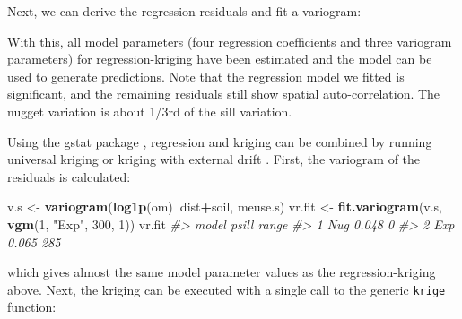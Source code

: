 \documentclass[graybox,natbib,nospthms,UStrade]{svmono}
\newenvironment{Shaded}{\begin{snugshade}}{\end{snugshade}}
\newcommand{\CommentTok}[1]{\textcolor[rgb]{0.37,0.37,0.37}{\textit{#1}}}
\newcommand{\DecValTok}[1]{\textcolor[rgb]{0.06,0.06,0.06}{#1}}
\newcommand{\KeywordTok}[1]{\textcolor[rgb]{0.27,0.27,0.27}{\textbf{#1}}}
\newcommand{\NormalTok}[1]{#1}
\newcommand{\OperatorTok}[1]{\textcolor[rgb]{0.43,0.43,0.43}{\textbf{#1}}}
\newcommand{\StringTok}[1]{\textcolor[rgb]{0.5,0.5,0.5}{#1}}
\begin{document}
Next, we can derive the regression residuals and fit a variogram:

\begin{Shaded}
\end{Shaded}

With this, all model parameters (four regression coefficients and three
variogram parameters) for regression-kriging have been estimated and the
model can be used to generate predictions. Note that the regression
model we fitted is significant, and the remaining residuals still show
spatial auto-correlation. The nugget variation is about 1/3rd of the sill
variation.

Using the gstat package \citep{Pebesma2004CG, Bivand2013Springer}, regression and
kriging can be combined by running universal kriging or kriging with
external drift \citep{hengl2007regression}. First, the variogram of the
residuals is calculated:

\begin{Shaded}
\begin{Highlighting}[]
\NormalTok{v.s <-}\StringTok{ }\KeywordTok{variogram}\NormalTok{(}\KeywordTok{log1p}\NormalTok{(om)}\OperatorTok{~}\NormalTok{dist}\OperatorTok{+}\NormalTok{soil, meuse.s)}
\NormalTok{vr.fit <-}\StringTok{ }\KeywordTok{fit.variogram}\NormalTok{(v.s, }\KeywordTok{vgm}\NormalTok{(}\DecValTok{1}\NormalTok{, }\StringTok{"Exp"}\NormalTok{, }\DecValTok{300}\NormalTok{, }\DecValTok{1}\NormalTok{))}
\NormalTok{vr.fit}
\CommentTok{#>   model psill range}
\CommentTok{#> 1   Nug 0.048     0}
\CommentTok{#> 2   Exp 0.065   285}
\end{Highlighting}
\end{Shaded}

which gives almost the same model parameter values as the
regression-kriging above. Next, the kriging can be executed with a
single call to the generic \texttt{krige} function:
\end{document}
